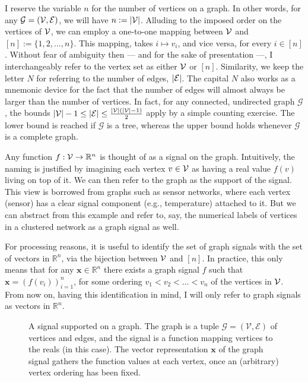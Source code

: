 I reserve the variable $n$ for the number of vertices on a graph. In other words, for any $\mathcal{G} = (\mathcal{V}, \mathcal{E})$, we will have $n := |\mathcal{V}|$. Alluding to the imposed order on the vertices of $\mathcal{V}$, we can employ a one-to-one mapping between $\mathcal{V}$ and $[n] := \{1, 2, \dots, n\}$. This mapping, takes $i \mapsto v_i$, and vice versa, for every $i \in [n]$. Without fear of ambiguity then --- and for the sake of presentation ---, I interchangeably refer to the vertex set as either $\mathcal{V}$ or $[n]$. Similarity, we keep the letter $N$ for referring to the number of edges, $|\mathcal{E}|$. The capital $N$ also works as a mnemonic device for the fact that the number of edges will almost always be larger than the number of vertices. In fact, for any connected, undirected graph $\mathcal{G}$, the bounds $|\mathcal{V}| - 1 \leq |\mathcal{E}| \leq \frac{|\mathcal{V}|(|\mathcal{V}| - 1)}{2}$ apply by a simple counting exercise. The lower bound is reached if $\mathcal{G}$ is a tree, whereas the upper bound holds whenever $\mathcal{G}$ is a complete graph.

Any function $f : \mathcal{V} \to \mathbb{R}^{n}$ is thought of as a signal on the graph. Intuitively, the naming is justified by imagining each vertex $v \in \mathcal{V}$ as having a real value $f(v)$ living on top of it. We can then refer to the graph as the support of the signal. This view is borrowed from graphs such as sensor networks, where each vertex (sensor) has a clear signal component (e.g., temperature) attached to it. But we can abstract from this example and refer to, say, the numerical labels of vertices in a clustered network as a graph signal as well.

For processing reasons, it is useful to identify the set of graph signals with the set of vectors in $\mathbb{R}^{n}$, via the bijection between $\mathcal{V}$ and $[n]$. In practice, this only means that for any $\mathbf{x} \in \mathbb{R}^{n}$ there exists a graph signal $f$ such that $\mathbf{x} = \left( f(v_i) \right)_{i = 1}^n$, for some ordering $v_1 < v_2 < \dots < v_n$ of the vertices in $\mathcal{V}$. From now on, having this identification in mind, I will only refer to graph signals as vectors in $\mathbb{R}^{n}$.

\begin{figure}[H]
    \centering
    
    \caption[A signal supported on a graph]{A signal supported on a graph. The graph is a tuple $\mathcal{G} = (\mathcal{V}, \mathcal{E})$ of vertices and edges, and the signal is a function mapping vertices to the reals (in this case). The vector representation $\mathbf{x}$ of the graph signal gathers the function values at each vertex, once an (arbitrary) vertex ordering has been fixed.}
    \label{fig:graph-signal-example}
\end{figure}


